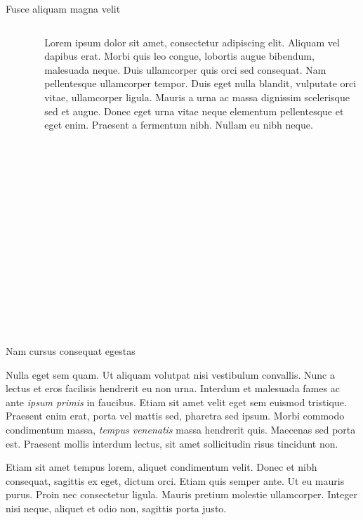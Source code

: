 \documentclass[final]{beamer}
\newlength{\colwidth}
\begin{document}
\begin{frame}[t]
\begin{columns}[t]
\begin{column}{\colwidth}
\begin{block}{Fusce aliquam magna velit}
\begin{columns}
\begin{column}{0.4\textwidth}
\begin{center}
      \begin{figure}
      \caption{Another figure caption.}
    \end{figure}
   \end{center}
\end{column}
\begin{column}{0.6\textwidth}  %
\justify
Lorem ipsum dolor sit amet, consectetur adipiscing elit. Aliquam vel dapibus erat. Morbi quis leo congue, lobortis augue bibendum, malesuada neque. Duis ullamcorper quis orci sed consequat. Nam pellentesque ullamcorper tempor. Duis eget nulla blandit, vulputate orci vitae, ullamcorper ligula. Mauris a urna ac massa dignissim scelerisque sed et augue. Donec eget urna vitae neque elementum pellentesque et eget enim. Praesent a fermentum nibh. Nullam eu nibh neque. 
\end{column}
\end{columns}


  \end{block}

  \begin{block}{Nam cursus consequat egestas}

    Nulla eget sem quam. Ut aliquam volutpat nisi vestibulum convallis. Nunc a
    lectus et eros facilisis hendrerit eu non urna. Interdum et malesuada fames
    ac ante \textit{ipsum primis} in faucibus. Etiam sit amet velit eget sem
    euismod tristique. Praesent enim erat, porta vel mattis sed, pharetra sed
    ipsum. Morbi commodo condimentum massa, \textit{tempus venenatis} massa
    hendrerit quis. Maecenas sed porta est. Praesent mollis interdum lectus,
    sit amet sollicitudin risus tincidunt non.

    Etiam sit amet tempus lorem, aliquet condimentum velit. Donec et nibh
    consequat, sagittis ex eget, dictum orci. Etiam quis semper ante. Ut eu
    mauris purus. Proin nec consectetur ligula. Mauris pretium molestie
    ullamcorper. Integer nisi neque, aliquet et odio non, sagittis porta justo.


\end{block}
\end{column}
\end{columns}
\end{frame}
\end{document}
